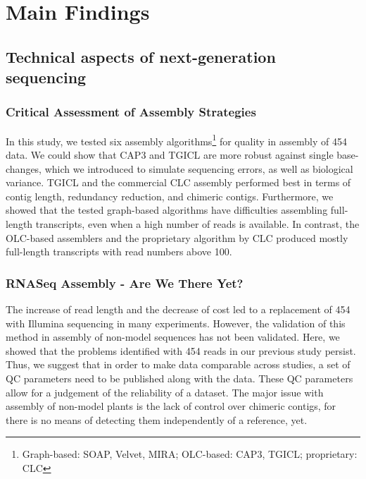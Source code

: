 \chapter{Main Findings} %

\section{Technical aspects of next-generation sequencing}
\subsection{Critical Assessment of Assembly Strategies
\cite{mp_Braeutigam2011}}

In this study, we tested six assembly algorithms\footnote{Graph-based: SOAP, Velvet, MIRA; OLC-based: CAP3, TGICL; proprietary: CLC} for quality in  assembly of 454 data. We could show that CAP3 and TGICL are more robust against single base-changes, which we introduced to simulate sequencing errors, as well as biological variance. TGICL and the commercial CLC  assembly performed best in terms of contig length, redundancy reduction, and chimeric contigs.
Furthermore, we showed that the tested graph-based algorithms have difficulties assembling full-length transcripts, even when a high number of reads is available. In contrast, the OLC-based assemblers and the proprietary algorithm by CLC produced mostly full-length transcripts with read numbers above 100.

\subsection{RNASeq Assembly - Are We There Yet? \cite{mp_Schliesky2012}}

The increase of read length and the decrease of cost led to a replacement of 454 with Illumina sequencing in many experiments. However, the validation of this method in  assembly of non-model sequences has not been validated. Here, we showed that the problems identified with 454 reads in our previous study \cite{mp_Braeutigam2011} persist. Thus, we suggest that in order to make data comparable across studies, a set of \ac{QC} parameters need to be published along with the data. These \ac{QC} parameters allow for a judgement of the reliability of a dataset.
The major issue with  assembly of non-model plants is the lack of control over chimeric contigs, for there is no means of detecting them independently of a reference, yet.


